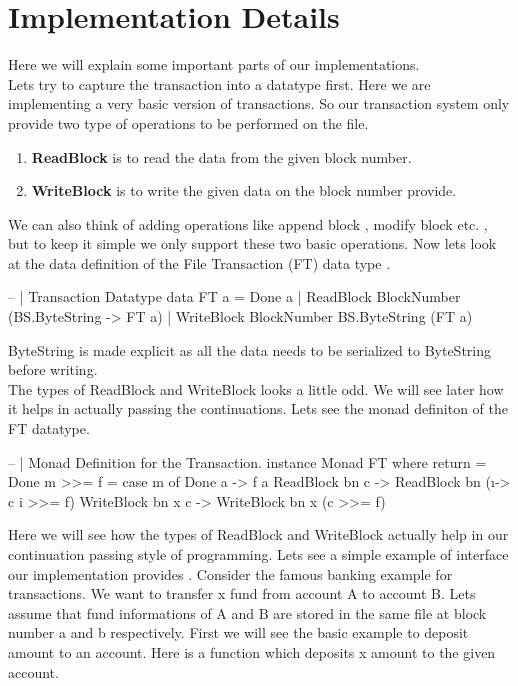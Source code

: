 \documentclass[11pt,a4paper]{article}
\begin{document}
\pagebreak
\section{Implementation Details}
Here we will explain some important parts of our implementations. \\
Lets try to capture the transaction into a datatype first. Here
we are implementing a very basic version of transactions. So our
transaction system only provide two type of operations to be performed
on the file.
\begin{enumerate}
\item \textbf{ReadBlock} is to read the data from the given block number.
\item \textbf{WriteBlock} is to write the given data on the block number provide.
\end{enumerate}
We can also think of adding operations like append block , modify block
etc. , but to keep it simple we only support these two basic operations.
Now lets look at the data definition of the File Transaction (FT) data
type . \\
\begin{code}
-- | Transaction Datatype
data FT a = 
    Done a | 
    ReadBlock BlockNumber (BS.ByteString -> FT a) | 
    WriteBlock BlockNumber BS.ByteString (FT a)
\end{code}
ByteString is made explicit as all the data needs to be serialized to ByteString before writing.\\
The types of ReadBlock and WriteBlock looks a little odd. We will see later how it helps in actually passing the continuations.
Lets see the monad definiton of the FT datatype. \\
\begin{code}
-- | Monad Definition for the Transaction. 
instance Monad FT where 
    return = Done 
    m >>= f = case m of 
        Done a -> f a 
        ReadBlock bn c -> ReadBlock bn (\i -> c i  >>= f) 
        WriteBlock bn x c -> WriteBlock bn x (c >>= f)
\end{code}
Here we will see how the types of ReadBlock and WriteBlock actually help
in our continuation passing style of programming. Lets see a simple
example of interface our implementation provides .
Consider the famous banking example for transactions. We want to
transfer x fund from account A to account B.
Lets assume that fund informations of A and B are stored in the same
file at block number a and b respectively.
First we will see the basic example to deposit amount to an account. 
Here is a function which deposits x amount to the given account. \\
\end{document}
